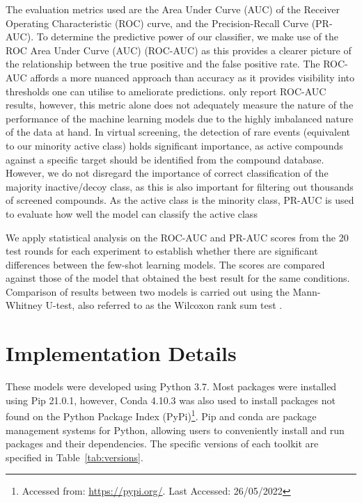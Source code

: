 The evaluation metrics used are the Area Under Curve (AUC) of the Receiver Operating Characteristic (ROC) curve, and the Precision-Recall Curve (PR-AUC). To determine the predictive power of our classifier, we make use of the ROC Area Under Curve (AUC) (ROC-AUC) as this provides a clearer picture of the relationship between the true positive and the false positive rate. The ROC-AUC affords a more nuanced approach than accuracy as it provides visibility into thresholds one can utilise to ameliorate predictions. \citet{altae2017low} only report ROC-AUC results, however, this metric alone does not adequately measure the nature of the performance of the machine learning models due to the highly imbalanced nature of the data at hand. In virtual screening, the detection of rare events (equivalent to our minority active class) holds significant importance, as active compounds against a specific target should be identified from the compound database. However, we do not disregard the importance of correct classification of the majority inactive/decoy class, as this is also important for filtering out thousands of screened compounds. As the active class is the minority class, PR-AUC is used to evaluate how well the model can classify the active class

We apply statistical analysis on the ROC-AUC and PR-AUC scores from the 20 test rounds for each experiment to establish whether there are significant differences between the few-shot learning models. The scores are compared against those of the model that obtained the best result for the same conditions. Comparison of results between two models is carried out using the Mann-Whitney U-test, also referred to as the Wilcoxon rank sum test \citep{mann1947test}.

\section{Implementation Details}

These models were developed using Python 3.7. Most packages were installed using Pip 21.0.1, however, Conda 4.10.3 was also used to install packages not found on the Python Package Index (PyPi)\footnote{Accessed from: \url{https://pypi.org/}. Last Accessed: 26/05/2022}. Pip and conda are package management systems for Python, allowing users to conveniently install and run packages and their dependencies. The specific versions of each toolkit are specified in Table~\ref{tab:versions}.

